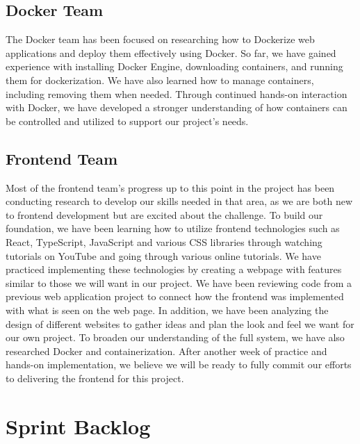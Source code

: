 \documentclass[12pt]{article}
\begin{document}
\subsection{Docker Team}
The Docker team has been focused on researching how to Dockerize web applications and deploy them effectively using Docker. So far, we have gained experience with installing Docker Engine, downloading containers, and running them for dockerization. We have also learned how to manage containers, including removing them when needed. Through continued hands-on interaction with Docker, we have developed a stronger understanding of how containers can be controlled and utilized to support our project’s needs.

\subsection {Frontend Team}
Most of the frontend team’s progress up to this point in the project has been conducting research to develop our skills needed in that area, as we are both new to frontend development but are excited about the challenge. To build our foundation, we have been learning how to utilize frontend technologies such as React, TypeScript, JavaScript and various CSS libraries through watching tutorials on YouTube and going through various online tutorials. We have practiced implementing these technologies by creating a webpage with features similar to those we will want in our project. We have been reviewing code from a previous web application project to connect how the frontend was implemented with what is seen on the web page. In addition, we have been analyzing the design of different websites to gather ideas and plan the look and feel we want for our own project. To broaden our understanding of the full system, we have also researched Docker and containerization. After another week of practice and hands-on implementation, we believe we will be ready to fully commit our efforts to delivering the frontend for this project.

\section{Sprint Backlog}
\end{document}
